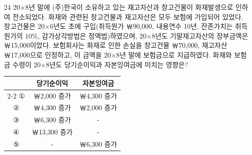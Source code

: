 \begin{question}{24}
20×8년 말에 (주)한국이 소유하고 있는 재고자산과 창고건물이 화재발생으로 인하여 전소되었다. 화재와 관련된 창고건물과 재고자산은 모두 보험에 가입되어 있었다. 창고건물은 20×6년도 초에 구입(취득원가 ￦90,000, 내용연수 10년, 잔존가치는 취득원가의 10\%, 감가상각방법은 정액법)하였으며, 20×8년도 기말재고자산의 장부금액은 ￦15,000이었다. 보험회사는 화재로 인한 손실을 창고건물 ￦70,000, 재고자산 ￦17,000으로 인정하고, 이 금액을 20×8년 말에 보험금으로 지급하였다. 화재와 보험금 수령이 20×8년도 당기순이익과 자본잉여금에 미치는 영향은?

{\small\centering
\begin{tabular}{@{}ccc@{}}
 & 당기순이익 & 자본잉여금 \\
\cline{2-2}\cline{3-3}
① & ￦2,000 증가 & ￦4,300 증가 \\
② & ￦4,300 증가 & ￦2,000 증가 \\
③ & ￦6,300 증가 & - \\
④ & ￦13,300 증가 & - \\
⑤ & - & ￦6,300 증가 \\
\end{tabular}\par}
\end{question}
